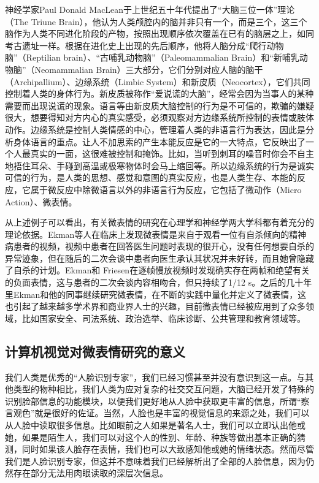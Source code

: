 神经学家Paul Donald MacLean于上世纪五十年代提出了“大脑三位一体”理论（The Triune Brain），他认为人类颅腔内的脑并非只有一个，而是三个，这三个脑作为人类不同进化阶段的产物，按照出现顺序依次覆盖在已有的脑层之上，如同考古遗址一样\citep{Brain1999Kazlev}。根据在进化史上出现的先后顺序，他将人脑分成“爬行动物脑”（Reptilian brain）、“古哺乳动物脑”（Paleomammalian Brain）和“新哺乳动物脑”（Neomammalian Brain）三大部分，它们分别对应人脑的脑干（Archipallium）、边缘系统（Limbic System）和新皮质（Neocortex），它们共同控制着人类的身体行为。新皮质被称作“爱说谎的大脑”，经常会因为当事人的某种需要而出现说谎的现象。语言等由新皮质大脑控制的行为是不可信的，欺骗的嫌疑很大，想要得知对方内心的真实感受，必须观察对方边缘系统所控制的表情或肢体动作。边缘系统是控制人类情感的中心，管理着人类的非语言行为表达，因此是分析身体语言的重点。让人不加思索的产生本能反应是它的一大特点，它反映出了一个人最真实的一面，这很难被控制和掩饰。比如，当听到刺耳的噪音时你会不自主地捂住耳朵、手碰到高温或极寒物体时会马上缩回等。所以边缘系统的行为是诚实可信的行为，是人类的思想、感觉和意图的真实反应，也是人类生存、本能的反应，它属于微反应中除微语言以外的非语言行为反应，它包括了微动作（Micro Action）、微表情。

从上述例子可以看出，有关微表情的研究在心理学和神经学两大学科都有着充分的理论依据。Ekman等人在临床上发现微表情是来自于观看一位有自杀倾向的精神病患者的视频，视频中患者在回答医生问题时表现的很开心，没有任何想要自杀的异常迹象，但在随后的二次会谈中患者向医生承认其状况并未好转，而且她曾隐藏了自杀的计划。Ekman和 Friesen在逐帧慢放视频时发现确实存在两帧和绝望有关的负面表情，这与患者的二次会谈内容相吻合，但只持续了1/12 s。之后的几十年里Ekman和他的同事继续研究微表情，在不断的实践中量化并定义了微表情，这也引起了越来越多学术界和商业界人士的兴趣，目前微表情已经被应用到了众多领域，比如国家安全、司法系统、政治选举、临床诊断、公共管理和教育领域等\citep{Chiu2014The}。

\subsection{计算机视觉对微表情研究的意义}

我们人类是优秀的“人脸识别专家”，我们已经习惯甚至并没有意识到这一点。与其他类型的物种相比，我们人类为应对复杂的社交交互问题，大脑已经开发了特殊的识别脸部信息的功能模块，以便我们更好地从人脸中获取更丰富的信息，所谓“察言观色”就是很好的佐证。当然，人脸也是丰富的视觉信息的来源之处，我们可以从人脸中读取很多信息。比如眼前之人如果是著名人士，我们可以立即认出他或她，如果是陌生人，我们可以对这个人的性别、年龄、种族等做出基本正确的猜测，同时如果该人脸存在表情，我们也可以大致感知他或她的情绪状态。然而尽管我们是人脸识别专家，但这并不意味着我们已经解析出了全部的人脸信息，因为仍然存在部分无法用肉眼读取的深层次信息。

